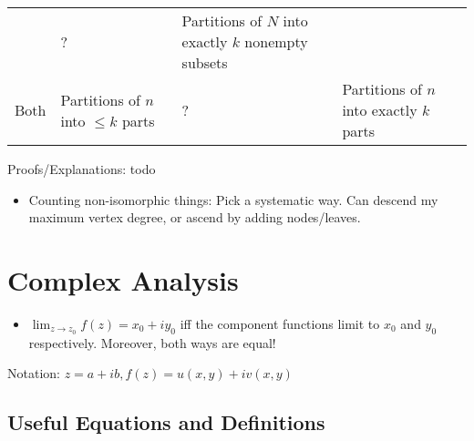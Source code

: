 \begin{longtable}[]{@{}llll@{}}
\begin{minipage}[t]{0.27\columnwidth}
\end{minipage} & \begin{minipage}[t]{0.27\columnwidth}\raggedright
?\strut
\end{minipage} & \begin{minipage}[t]{0.18\columnwidth}\raggedright
Partitions of \(N\) into exactly \(k\) nonempty subsets\strut
\end{minipage}\tabularnewline
\begin{minipage}[t]{0.18\columnwidth}\raggedright
Both\strut
\end{minipage} & \begin{minipage}[t]{0.27\columnwidth}\raggedright
Partitions of \(n\) into \(\leq k\) parts\strut
\end{minipage} & \begin{minipage}[t]{0.27\columnwidth}\raggedright
?\strut
\end{minipage} & \begin{minipage}[t]{0.18\columnwidth}\raggedright
Partitions of \(n\) into exactly \(k\) parts\strut
\end{minipage}\tabularnewline
\bottomrule
\end{longtable}

Proofs/Explanations: todo

\begin{itemize}
\tightlist
\item
  Counting non-isomorphic things: Pick a systematic way. Can descend my
  maximum vertex degree, or ascend by adding nodes/leaves.
\end{itemize}

\hypertarget{complex-analysis}{%
\section{Complex Analysis}\label{complex-analysis}}

\begin{itemize}
\tightlist
\item
  \(\lim_{z\rightarrow z_0} f(z) = x_0 + iy_0\) iff the component
  functions limit to \(x_0\) and \(y_0\) respectively. Moreover, both
  ways are equal!
\end{itemize}

Notation: \(z = a + ib, f(z) = u(x, y) + iv(x, y)\)

\hypertarget{useful-equations-and-definitions}{%
\subsection{Useful Equations and
Definitions}\label{useful-equations-and-definitions}}


